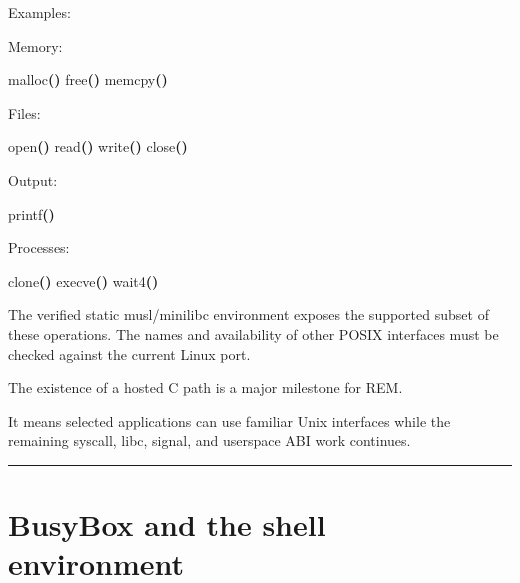 \documentclass[
  oneside,
  openany]{book}
\newenvironment{Shaded}{\begin{snugshade}}{\end{snugshade}}
\newcommand{\NormalTok}[1]{#1}
\newcommand{\OperatorTok}[1]{\textcolor[rgb]{0.81,0.36,0.00}{\textbf{#1}}}
\begin{document}
Examples:

Memory:

\begin{Shaded}
\begin{Highlighting}[]
\NormalTok{malloc}\OperatorTok{()}
\NormalTok{free}\OperatorTok{()}
\NormalTok{memcpy}\OperatorTok{()}
\end{Highlighting}
\end{Shaded}

Files:

\begin{Shaded}
\begin{Highlighting}[]
\NormalTok{open}\OperatorTok{()}
\NormalTok{read}\OperatorTok{()}
\NormalTok{write}\OperatorTok{()}
\NormalTok{close}\OperatorTok{()}
\end{Highlighting}
\end{Shaded}

Output:

\begin{Shaded}
\begin{Highlighting}[]
\NormalTok{printf}\OperatorTok{()}
\end{Highlighting}
\end{Shaded}

Processes:

\begin{Shaded}
\begin{Highlighting}[]
\NormalTok{clone}\OperatorTok{()}
\NormalTok{execve}\OperatorTok{()}
\NormalTok{wait4}\OperatorTok{()}
\end{Highlighting}
\end{Shaded}

The verified static musl/minilibc environment exposes the supported
subset of these operations. The names and availability of other POSIX
interfaces must be checked against the current Linux port.

The existence of a hosted C path is a major milestone for REM.

It means selected applications can use familiar Unix interfaces while
the remaining syscall, libc, signal, and userspace ABI work continues.

\begin{center}\rule{0.5\linewidth}{0.5pt}\end{center}

\hypertarget{busybox-and-the-shell-environment}{%
\section{BusyBox and the shell
environment}\label{busybox-and-the-shell-environment}}
\end{document}
